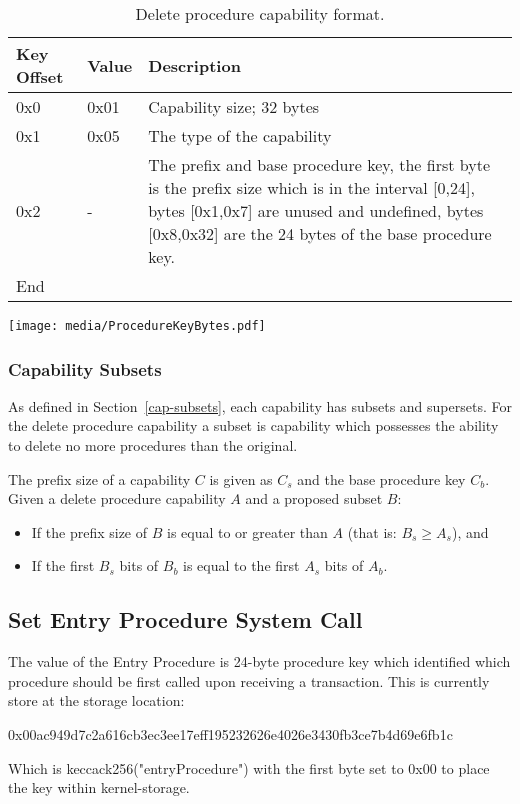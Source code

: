 \documentclass[english,a4paper]{article}
\let\oldparagraph\subsubsection
\renewcommand{\subsubsection}[1]{\oldparagraph{#1}\mbox{}}
\begin{document}
\begin{table}[H]
  \caption{Delete procedure capability format.}
  \centering{}%
  \begin{tabular}{l|l|p{}}
    \hline
    Key Offset & Value & Description\tabularnewline
    \hline
    \hline
    0x0 & 0x01 & Capability size; 32 bytes \tabularnewline
    0x1 & 0x05 & The type of the capability \tabularnewline
    0x2 & -    & The prefix and base procedure key, the first byte is the prefix
                 size which is in the interval [0,24], bytes [0x1,0x7] are
                 unused and undefined, bytes [0x8,0x32] are the 24 bytes of the
                 base procedure key. \tabularnewline
    \hline
    End &  \tabularnewline
    \hline
  \end{tabular}
\end{table}

\texttt{[image: media/ProcedureKeyBytes.pdf]}

\subsubsection{Capability Subsets}
As defined in Section~\ref{cap-subsets}, each capability has subsets and
supersets. For the delete procedure capability a subset is capability which
possesses the ability to delete no more procedures than the original.

The prefix size of a capability $C$ is given as $C_s$ and the base procedure key
$C_b$. Given a delete procedure capability $A$ and a proposed subset $B$:
\begin{itemize}
  \item If the prefix size of $B$ is equal to or greater than $A$ (that is: $B_s
  \geq A_s$), and
  \item If the first $B_s$ bits of $B_b$ is equal to the first $A_s$ bits of
  $A_b$.
\end{itemize}

\subsection{Set Entry Procedure System Call}
The value of the Entry Procedure is 24-byte procedure key which identified which
procedure should be first called upon receiving a transaction. This is currently
store at the storage location:

0x00ac949d7c2a616cb3ec3ee17eff195232626e4026e3430fb3ce7b4d69e6fb1c

Which is keccack256("entryProcedure") with the first byte set to 0x00 to place
the key within kernel-storage.
\end{document}
